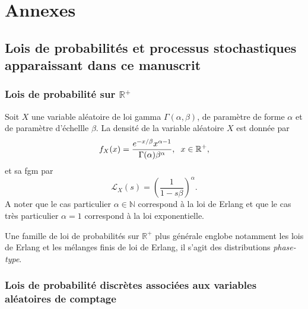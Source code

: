 \chapter{Annexes}


\section{Lois de probabilités et processus stochastiques apparaissant dans ce manuscrit}
\subsection{Lois de probabilité sur $\mathbb{R}^{+}$}\label{AppendiceProbabilityPositiveContinuous}
\begin{Def}\label{DefinitionGamma}
Soit $X$ une variable aléatoire de loi gamma $\Gamma(\alpha,\beta)$, de paramètre de forme $\alpha$ et de paramètre d'échellle $\beta$. La densité de la variable aléatoire $X$ est donnée par 
\begin{equation}\label{GammaDensity}
f_{X}(x)=\frac{e^{-x/\beta}x^{\alpha-1}}{\Gamma(\alpha)\beta^{\alpha}},\hspace{0.2cm}x\in\mathbb{R}^{+},
\end{equation}
et sa \gls{fgm} par
\begin{equation}\label{fgmGamma}
\mathcal{L}_{X}(s)=\left(\frac{1}{1-s\beta}\right)^{\alpha}.
\end{equation}
A noter que le cas particulier $\alpha\in\mathbb{N}$ correspond à la loi de Erlang et que le cas très particulier $\alpha=1$ correspond à la loi exponentielle.
\end{Def}
Une famille de loi de probabilités sur $\mathbb{R}^{+}$ plus générale englobe notamment les lois de Erlang et les mélanges finis de loi de Erlang, il s'agit des distributions \textit{phase-type}.




\subsection{Lois de probabilité discrètes associées aux variables aléatoires de comptage}\label{AppendiceProbabilityDiscrete}

